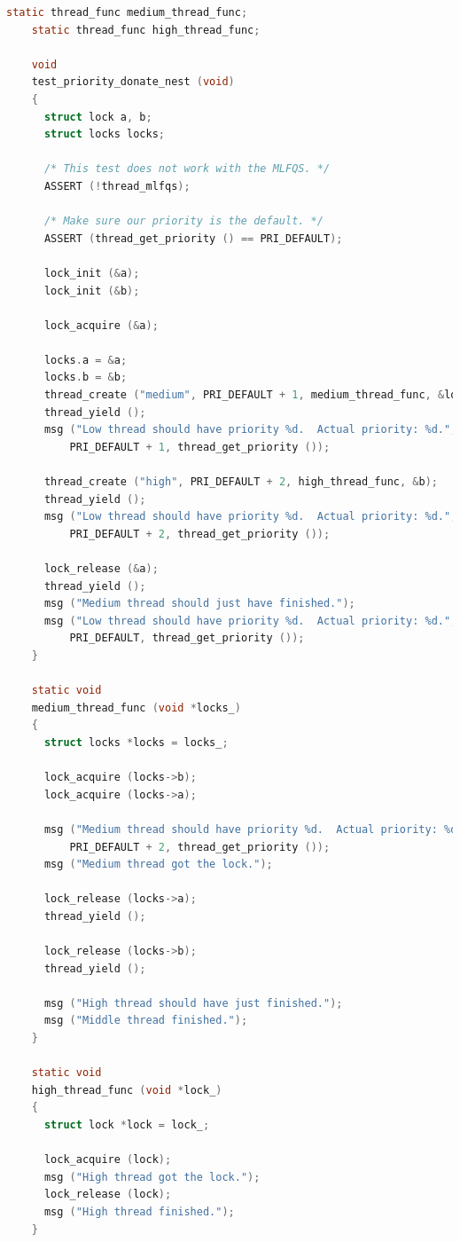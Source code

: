 \documentclass{article}
\begin{document}
\begin{lstlisting}[language=C, title=\texttt{priority-donate-nest}测试]
    static thread_func medium_thread_func;
    static thread_func high_thread_func;
    
    void
    test_priority_donate_nest (void) 
    {
      struct lock a, b;
      struct locks locks;
    
      /* This test does not work with the MLFQS. */
      ASSERT (!thread_mlfqs);
    
      /* Make sure our priority is the default. */
      ASSERT (thread_get_priority () == PRI_DEFAULT);
    
      lock_init (&a);
      lock_init (&b);
    
      lock_acquire (&a);
    
      locks.a = &a;
      locks.b = &b;
      thread_create ("medium", PRI_DEFAULT + 1, medium_thread_func, &locks);
      thread_yield ();
      msg ("Low thread should have priority %d.  Actual priority: %d.",
          PRI_DEFAULT + 1, thread_get_priority ());
    
      thread_create ("high", PRI_DEFAULT + 2, high_thread_func, &b);
      thread_yield ();
      msg ("Low thread should have priority %d.  Actual priority: %d.",
          PRI_DEFAULT + 2, thread_get_priority ());
    
      lock_release (&a);
      thread_yield ();
      msg ("Medium thread should just have finished.");
      msg ("Low thread should have priority %d.  Actual priority: %d.",
          PRI_DEFAULT, thread_get_priority ());
    }
    
    static void
    medium_thread_func (void *locks_) 
    {
      struct locks *locks = locks_;
    
      lock_acquire (locks->b);
      lock_acquire (locks->a);
    
      msg ("Medium thread should have priority %d.  Actual priority: %d.",
          PRI_DEFAULT + 2, thread_get_priority ());
      msg ("Medium thread got the lock.");
    
      lock_release (locks->a);
      thread_yield ();
    
      lock_release (locks->b);
      thread_yield ();
    
      msg ("High thread should have just finished.");
      msg ("Middle thread finished.");
    }
    
    static void
    high_thread_func (void *lock_) 
    {
      struct lock *lock = lock_;
    
      lock_acquire (lock);
      msg ("High thread got the lock.");
      lock_release (lock);
      msg ("High thread finished.");
    }
\end{lstlisting}
\end{document}
